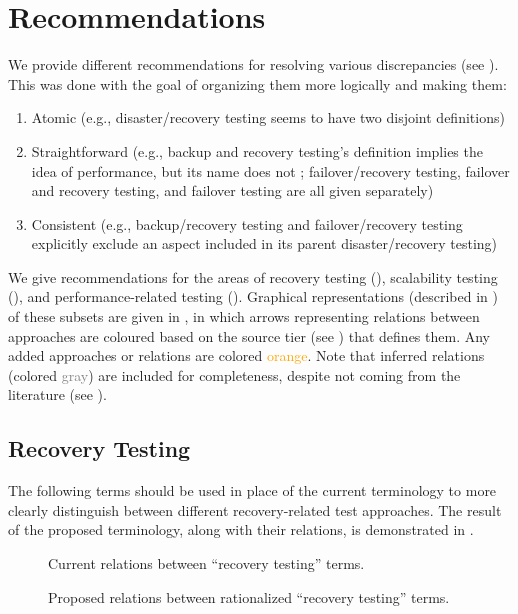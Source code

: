 \section{Recommendations}
\label{recs}

We provide different recommendations for resolving various
discrepancies (see ). This was done with the goal of
organizing them more logically and making them:
\begin{enumerate}
    \item Atomic (e.g., disaster/recovery testing seems to have two
          disjoint definitions)
    \item Straightforward (e.g., backup and recovery testing's definition
          implies the idea of performance, but its name does not
          \ifnotpaper; failover/recovery testing, failover and recovery
          testing, and failover testing are all given separately\fi)
    \item Consistent (e.g., backup/recovery testing and failover/recovery
          testing explicitly exclude an aspect included in its parent
          disaster/recovery testing)
\end{enumerate}
We give recommendations for the areas of recovery testing (),
scalability testing (), and performance-related testing
(). Graphical representations (described in
) of these subsets are given in
\recFigs{}, in which arrows representing relations between approaches are
coloured based on the source tier (see ) that defines them.
Any added approaches or relations are colored \textcolor{orange}{orange}.
\ifnotpaper Note that
    inferred relations (colored \textcolor{gray}{gray}) are included for
    completeness, despite not coming from the
    literature (see ).
\fi

\subsection{Recovery Testing}
\label{rec-test-rec}
The following terms should be used in place of the current terminology to
more clearly distinguish between different recovery-related test approaches.
The result of the proposed terminology, along with their relations, is
demonstrated in .

\begin{figure}[bt!]
    \centering
    \begin{minipage}{.575\linewidth}
        \centering
        \recoveryGraphCurrent{}
        \caption{Current relations between ``recovery
            testing'' terms.}
        \label{fig:recovery-graph-current}
    \end{minipage}%
    \begin{minipage}{.425\linewidth}
        \centering
        \recoveryGraphProposed{}
        \caption{Proposed relations between
            rationalized ``recovery testing'' terms.}
        \label{fig:recovery-graph-proposed}
    \end{minipage}
\end{figure}

